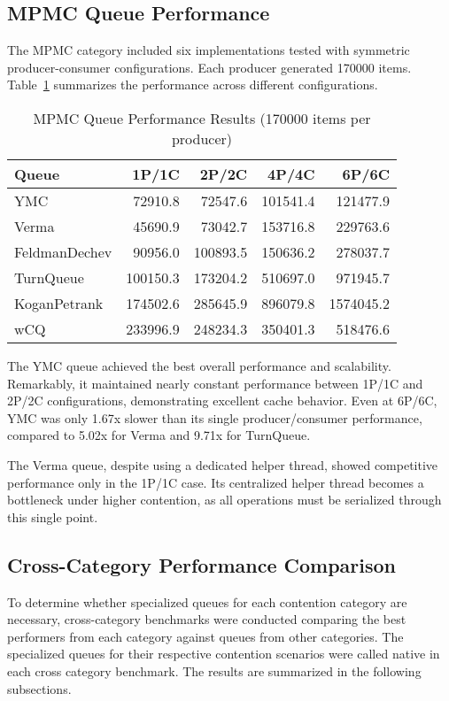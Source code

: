 \subsection{\acf{MPMC} Queue Performance}
The \ac{MPMC} category included six implementations tested with symmetric producer-consumer configurations. Each producer generated 170000 items. Table~\ref{tab:mpmc-results} summarizes the performance across different configurations.

\begin{table}[htb]
\centering
\caption{\ac{MPMC} Queue Performance Results (170000 items per producer)}
\label{tab:mpmc-results}
\begin{tabular}{@{}lrrrr@{}}
\toprule
Queue & 1P/1C & 2P/2C & 4P/4C & 6P/6C \\
\midrule
\ac{YMC} & 72910.8 & 72547.6 & 101541.4 & 121477.9 \\
Verma & 45690.9 & 73042.7 & 153716.8 & 229763.6 \\
FeldmanDechev & 90956.0 & 100893.5 & 150636.2 & 278037.7 \\
TurnQueue & 100150.3 & 173204.2 & 510697.0 & 971945.7 \\
KoganPetrank & 174502.6 & 285645.9 & 896079.8 & 1574045.2 \\
\ac{wCQ} & 233996.9 & 248234.3 & 350401.3 & 518476.6 \\
\bottomrule
\end{tabular}
\end{table}

The \ac{YMC} queue achieved the best overall performance and scalability. Remarkably, it maintained nearly constant performance between 1P/1C and 2P/2C configurations, demonstrating excellent cache behavior. Even at 6P/6C, \ac{YMC} was only 1.67x slower than its single producer/consumer performance, compared to 5.02x for Verma and 9.71x for TurnQueue.

The Verma queue, despite using a dedicated helper thread, showed competitive performance only in the 1P/1C case. Its centralized helper thread becomes a bottleneck under higher contention, as all operations must be serialized through this single point.

\subsection{Cross-Category Performance Comparison}
To determine whether specialized queues for each contention category are necessary, cross-category benchmarks were conducted comparing the best performers from each category against queues from other categories. The specialized queues for their respective contention scenarios were called native in each cross category benchmark. The results are summarized in the following subsections.


